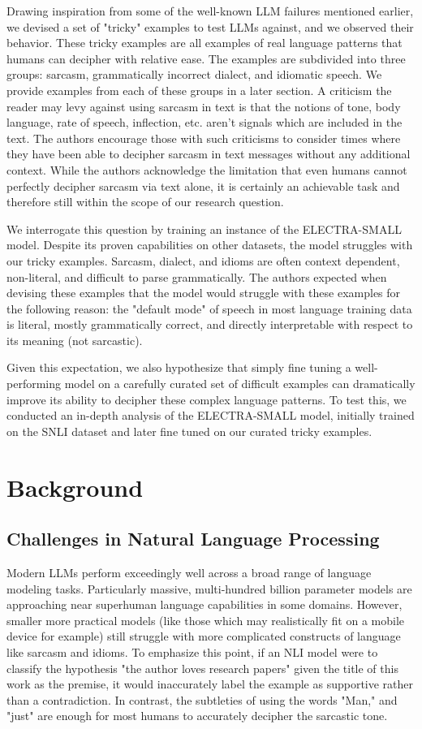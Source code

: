 \documentclass{article}
\begin{document}
Drawing inspiration from some of the well-known LLM failures mentioned earlier, we devised a set of "tricky" examples to
test LLMs against, and we observed their behavior. These tricky examples are all examples of real language patterns that
humans can decipher with relative ease. The examples are subdivided into three groups:  sarcasm, grammatically incorrect
dialect, and idiomatic speech. We provide examples from each of these groups in a later section.
A criticism the reader may levy against using sarcasm in text is that the notions of tone,
body language, rate of speech, inflection, etc. aren't signals which are included in the text. The authors encourage those
with such criticisms to consider times where they have been able to decipher sarcasm in text messages without any additional
context. While the authors acknowledge the limitation that even humans cannot perfectly decipher sarcasm via text alone,
it is certainly an achievable task and therefore still within the scope of our research question.

We interrogate this question by training an instance of the ELECTRA-SMALL model. Despite its proven capabilities on other datasets,
the model struggles with our tricky examples. Sarcasm, dialect, and idioms are often context dependent, non-literal, and
difficult to parse grammatically. The authors expected when devising these examples that the model would struggle with these
examples for the following reason:  the "default mode" of speech in most language training data is literal, mostly grammatically
correct, and directly interpretable with respect to its meaning (not sarcastic).

Given this expectation, we also hypothesize that simply fine tuning a well-performing model on a carefully curated set
of difficult examples can dramatically improve its ability to decipher these complex language patterns. To test this,
we conducted an in-depth analysis of the ELECTRA-SMALL model, initially trained on the SNLI dataset and later fine tuned
on our curated tricky examples.

\section{Background}

\subsection{Challenges in Natural Language Processing}
Modern LLMs perform exceedingly well across a broad range of language modeling tasks. Particularly massive, multi-hundred billion
parameter models are approaching near superhuman language capabilities in some domains. However, smaller more practical models
(like those which may realistically fit on a mobile device for example) still struggle with more complicated constructs of language
like sarcasm and idioms. To emphasize this point, if an NLI model were to classify the hypothesis "the author loves research papers"
given the title of this work as the premise, it would inaccurately label the example as supportive rather than a contradiction.
In contrast, the subtleties of using the words "Man," and "just" are enough for most humans to accurately decipher the
sarcastic tone.
\end{document}
